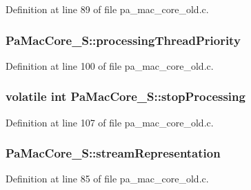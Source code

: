Definition at line 89 of file pa\+\_\+mac\+\_\+core\+\_\+old.\+c.

\subsubsection[{\texorpdfstring{processing\+Thread\+Priority}{processingThreadPriority}}]{ Pa\+Mac\+Core\+\_\+\+S\+::processing\+Thread\+Priority}\hypertarget{struct_pa_mac_core___s_a188755e083fbfff87ad6bb57c08fbfe1}{}\label{struct_pa_mac_core___s_a188755e083fbfff87ad6bb57c08fbfe1}


Definition at line 100 of file pa\+\_\+mac\+\_\+core\+\_\+old.\+c.

\subsubsection[{\texorpdfstring{stop\+Processing}{stopProcessing}}]{\setlength{\rightskip}{0pt plus 5cm}volatile {\bf int} Pa\+Mac\+Core\+\_\+\+S\+::stop\+Processing}\hypertarget{struct_pa_mac_core___s_ab18e0e8e4ef7c2746b573ae83c0e5c36}{}\label{struct_pa_mac_core___s_ab18e0e8e4ef7c2746b573ae83c0e5c36}


Definition at line 107 of file pa\+\_\+mac\+\_\+core\+\_\+old.\+c.

\subsubsection[{\texorpdfstring{stream\+Representation}{streamRepresentation}}]{ Pa\+Mac\+Core\+\_\+\+S\+::stream\+Representation}\hypertarget{struct_pa_mac_core___s_a33b14f2443b74f82ff4404cda2576c26}{}\label{struct_pa_mac_core___s_a33b14f2443b74f82ff4404cda2576c26}


Definition at line 85 of file pa\+\_\+mac\+\_\+core\+\_\+old.\+c.

